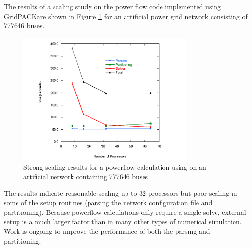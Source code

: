 \documentclass[preprint]{acm_proc_article-sp}
\begin{document}
The results of a scaling study on the power flow code implemented using
GridPACK\texttrademark are shown in Figure \ref{powerflow} for an
artificial power grid network consisting of 777646 buses.
\begin{figure}
\centering
\includegraphics[width=3.5in,keepaspectratio=true]{./Fig8}
\caption{\label{powerflow} Strong scaling results for a powerflow calculation
using on an artificial network containing 777646 buses }
\end{figure}
The results indicate reasonable scaling up to 32 processors but poor scaling in
some of the setup routines (parsing the network configuration file and
partitioning). Because powerflow calculations only require a single solve,
external setup is a much larger factor than in many other types of numerical
simulation. Work is ongoing to improve the performance of both the parsing and
partitioning.
\end{document}
